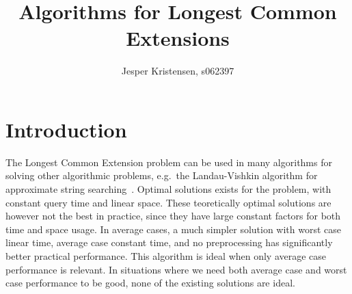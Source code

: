 \documentclass[a4]{article}
\title{Algorithms for Longest Common Extensions}
\author{Jesper Kristensen, s062397}
\begin{document}
\newif\ifarticle
\newif\ifreport

\reporttrue

\maketitle

\newcommand{\sortt}{\textit{sort}(n,\sigma)}
\newcommand{\LCE}{\textit{LCE}}
\newcommand{\NCA}{\textit{NCA}}
\newcommand{\RMQ}{\textit{RMQ}}
\newcommand{\SA}{\textit{SA}}
\newcommand{\SAinv}{\textit{SA}^{-1}} %
\newcommand{\SAi}{SA$^{-1}$} %
\newcommand{\LCP}{\textit{LCP}}
\newcommand{\LA}{\textit{LA}}
\newcommand{\suff}{\textit{suff}}
\newcommand{\logceil}{\lceil\log n\rceil}
\newcommand{\fprint}[1][k]{\ensuremath{\proc{Fingerprint}_{#1}}}
\newcommand{\fprintk}{\fprint[k]}
\newcommand{\RMQpq}[2]{RMQ\textless$#1$, $#2$\textgreater}
\newcommand{\RMQn}{\RMQpq{1}{n}}
\newcommand{\RMQq}{\RMQpq{n}{1}}
\newcommand{\RMQlog}{\RMQpq{n}{\log n}}


\tableofcontents

\vspace{1cm}

\newpage

\section{Introduction\label{sec:intro}}

The Longest Common Extension problem can be used in many algorithms for solving other algorithmic problems, e.g.\ the Landau-Vishkin algorithm for approximate string searching~\cite{approx-search}. Optimal solutions exists for the problem, with constant query time and linear space. These teoretically optimal solutions are however not the best in practice, since they have large constant factors for both time and space usage. In average cases, a much simpler solution with worst case linear time, average case constant time, and no preprocessing has significantly better practical performance. This algorithm is ideal when only average case performance is relevant. In situations where we need both average case and worst case performance to be good, none of the existing solutions are ideal.
\end{document}
